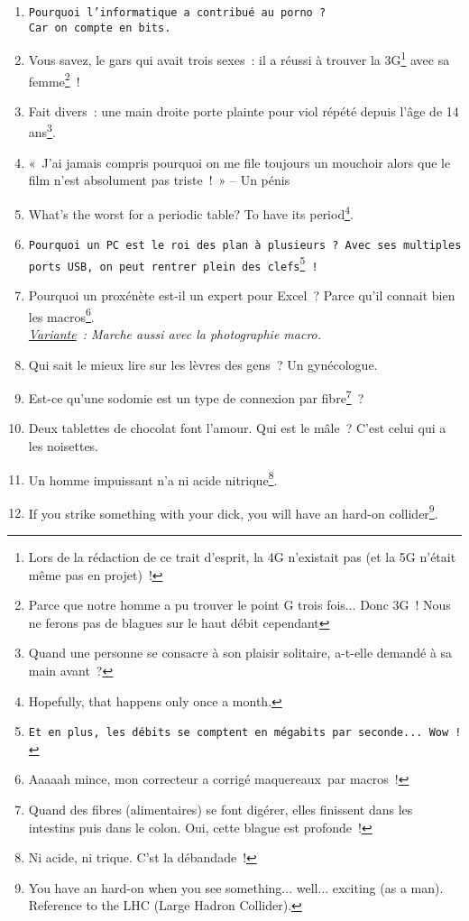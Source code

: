 \documentclass[10pt,a5paper,fullpage]{book}
\begin{document}
	\begin{enumerate}
		\item \texttt{Pourquoi l’informatique a contribué au porno~? \\Car on compte en bits.}
		\item Vous savez, le gars qui avait trois sexes~: il a réussi à trouver la 3G\footnote{Lors de la rédaction de ce trait d'esprit, la 4G n'existait pas (et la 5G n'était même pas en projet)~!} avec sa femme\footnote{Parce que notre homme a pu trouver le point G trois fois... Donc 3G~! Nous ne ferons pas de blagues sur le haut débit cependant}~!
		\item Fait divers~: une main droite porte plainte pour viol répété depuis l’âge de 14 ans\footnote{Quand une personne se consacre à son plaisir solitaire, a-t-elle demandé à sa main avant~?}.
		\item «~J’ai jamais compris pourquoi on me file toujours un mouchoir alors que le film n’est absolument pas triste~!~» -- Un pénis
		\item What’s the worst for a periodic table? To have its period\footnote{Hopefully, that happens only once a month.}.
		\item \texttt{Pourquoi un PC est le roi des plan à plusieurs~? Avec ses multiples ports USB, on peut rentrer plein des clefs\footnote{Et en plus, les débits se comptent en mégabits par seconde... Wow~!}~!~}
		\item Pourquoi un proxénète est-il un expert pour Excel~? Parce qu’il connait bien les macros\footnote{Aaaaah mince, mon correcteur a corrigé maquereaux par macros~!}.
		\\ \textit{\underline{Variante}~: Marche aussi avec la photographie macro.}			
		\item Qui sait le mieux lire sur les lèvres des gens~? Un gynécologue.
		\item Est-ce qu'une sodomie est un type de connexion par fibre\footnote{Quand des fibres (alimentaires) se font digérer, elles finissent dans les intestins puis dans le colon. Oui, cette blague est profonde~!}~?
		\item Deux tablettes de chocolat font l’amour. Qui est le mâle~? C’est celui qui a les noisettes. 
		\item Un homme impuissant n’a ni acide nitrique\footnote{Ni acide, ni trique. C'st la débandade~!}.
		\item If you strike something with your dick, you will have an hard-on collider\footnote{You have an hard-on when you see something... well... exciting (as a man). Reference to the LHC (Large Hadron Collider).}. 

\end{enumerate}
\end{document}
